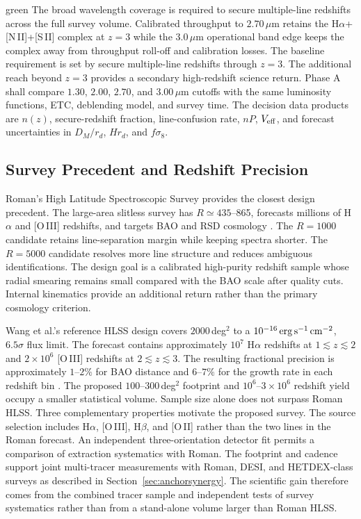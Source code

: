 \begin{leadbox}[title=Cosmology Wavelength Requirement]{green}
The broad wavelength coverage is required to secure multiple-line redshifts across the full survey volume. Calibrated throughput to $2.70\,\mu$m retains the H$\alpha$+[N\,II]+[S\,II] complex at $z=3$ while the $3.0\,\mu$m operational band edge keeps the complex away from throughput roll-off and calibration losses. The baseline requirement is set by secure multiple-line redshifts through $z=3$. The additional reach beyond $z=3$ provides a secondary high-redshift science return. Phase A shall compare $1.30$, $2.00$, $2.70$, and $3.00\,\mu$m cutoffs with the same luminosity functions, ETC, deblending model, and survey time. The decision data products are $n(z)$, secure-redshift fraction, line-confusion rate, $nP$, $V_{\rm eff}$, and forecast uncertainties in $D_M/r_d$, $Hr_d$, and $f\sigma_8$.
\end{leadbox}

\subsection{Survey Precedent and Redshift Precision}

Roman's High Latitude Spectroscopic Survey provides the closest design precedent. The large-area slitless survey has $R\simeq435$--865, forecasts millions of H$\alpha$ and [O\,III] redshifts, and targets BAO and RSD cosmology \cite{wang2021}. The $R=1000$ candidate retains line-separation margin while keeping spectra shorter. The $R=5000$ candidate resolves more line structure and reduces ambiguous identifications. The design goal is a calibrated high-purity redshift sample whose radial smearing remains small compared with the BAO scale after quality cuts. Internal kinematics provide an additional return rather than the primary cosmology criterion.

Wang et al.'s reference HLSS design covers $2000$\,deg$^2$ to a $10^{-16}\,{\rm erg\,s^{-1}\,cm^{-2}}$, $6.5\sigma$ flux limit. The forecast contains approximately $10^7$ H$\alpha$ redshifts at $1\lesssim z\lesssim2$ and $2\times10^6$ [O\,III] redshifts at $2\lesssim z\lesssim3$. The resulting fractional precision is approximately $1$--$2\%$ for BAO distance and $6$--$7\%$ for the growth rate in each redshift bin \cite{wang2021}. The proposed $100$--$300$\,deg$^2$ footprint and $10^6$--$3\times10^6$ redshift yield occupy a smaller statistical volume. Sample size alone does not surpass Roman HLSS. Three complementary properties motivate the proposed survey. The source selection includes H$\alpha$, [O\,III], H$\beta$, and [O\,II] rather than the two lines in the Roman forecast. An independent three-orientation detector fit permits a comparison of extraction systematics with Roman. The footprint and cadence support joint multi-tracer measurements with Roman, DESI, and HETDEX-class surveys as described in Section~\ref{sec:anchorsynergy}. The scientific gain therefore comes from the combined tracer sample and independent tests of survey systematics rather than from a stand-alone volume larger than Roman HLSS.


